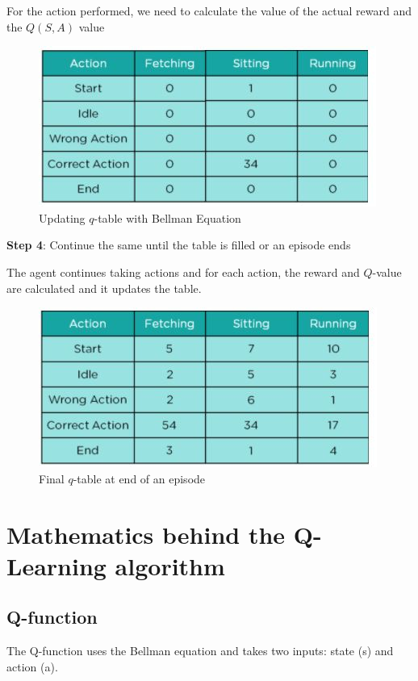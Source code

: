 For the action performed, we need to calculate the value of the actual reward and 
the $Q( S, A )$ value

\begin{figure}[!htb]
\centering
\includegraphics[scale=0.618]{pix/q_learning/9-updatingq.jpg}
\caption{Updating $q$-table with Bellman Equation}
\end{figure}

{\bf Step 4}: Continue the same until the table is filled or an episode ends

The agent continues taking actions and for each action, the reward and $Q$-value are 
calculated and it updates the table.

\begin{figure}[!htb]
\centering
\includegraphics[scale=0.618]{pix/q_learning/10-finalq.jpg}
\caption{Final $q$-table at end of an episode}
\end{figure}


\section{Mathematics behind the Q-Learning algorithm}

\subsection{Q-function}

The Q-function uses the Bellman equation and takes two inputs: state (s) and action (a).

